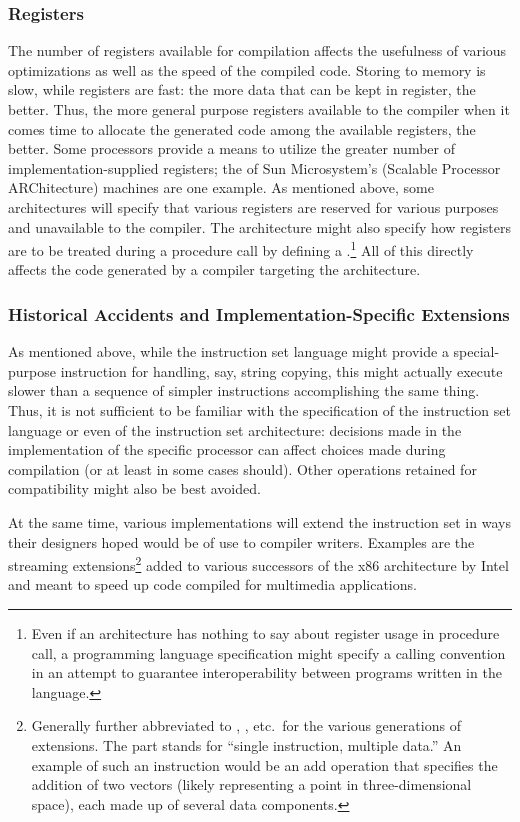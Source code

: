 \subsubsection{Registers}
The number of registers available for compilation affects the usefulness of various optimizations as well as the speed of the compiled code. Storing to memory is slow, while registers are fast: the more data that can be kept in register, the better. Thus, the more general purpose registers available to the compiler when it comes time to allocate the generated code among the available registers, the better. Some processors provide a means to utilize the greater number of implementation-supplied registers; the  of Sun Microsystem's  (Scalable Processor ARChitecture) machines are one example. As mentioned above, some architectures will specify that various registers are reserved for various purposes and unavailable to the compiler. The architecture might also specify how registers are to be treated during a procedure call by defining a .\footnote{Even if an architecture has nothing to say about register usage in procedure call, a programming language specification might specify a calling convention in an attempt to guarantee interoperability between programs written in the language.} All of this directly affects the code generated by a compiler targeting the architecture.

\subsubsection{Historical Accidents and Implementation-Specific Extensions}
As mentioned above, while the instruction set language might provide a special-purpose instruction for handling, say, string copying, this might actually execute slower than a sequence of simpler instructions accomplishing the same thing. Thus, it is not sufficient to be familiar with the specification of the instruction set language or even of the instruction set architecture: decisions made in the implementation of the specific processor can affect choices made during compilation (or at least in some cases should). Other operations retained for compatibility might also be best avoided.

At the same time, various implementations will extend the instruction set in ways their designers hoped would be of use to compiler writers. Examples are the streaming  extensions\footnote{Generally further abbreviated to , , etc.\ for the various generations of extensions. The  part stands for ``single instruction, multiple data.'' An example of such an instruction would be an add operation that specifies the addition of two vectors (likely representing a point in three-dimensional space), each made up of several data components.} added to various successors of the x86 architecture by Intel and  meant to speed up code compiled for multimedia applications.

